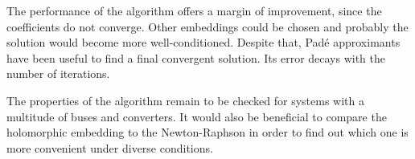 \documentclass[conference]{IEEEtran}
\begin{document}
The performance of the algorithm offers a margin of improvement, since the coefficients do not converge. Other embeddings could be chosen and probably the solution would become more well-conditioned. Despite that, Padé approximants have been useful to find a final convergent solution. Its error decays with the number of iterations. 

The properties of the algorithm remain to be checked for systems with a multitude of buses and converters. It would also be beneficial to compare the holomorphic embedding to the Newton-Raphson in order to find out which one is more convenient under diverse conditions. 











\end{document}
